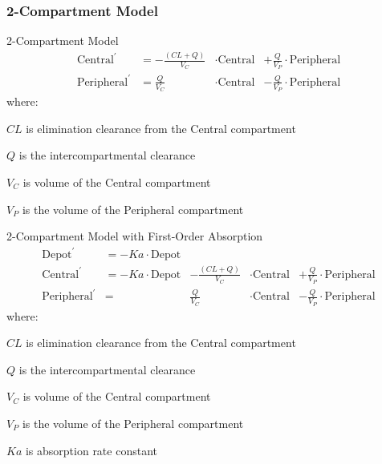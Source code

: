 \subsubsection{2-Compartment Model}
\begin{frame}{2-Compartment Model}
    $$
        \begin{aligned}
            \text{Central}^{\prime}    & = -\frac{(CL + Q)}{V_C} & \cdot \text{Central} & + \frac{Q}{V_P} \cdot \text{Peripheral} \\
            \text{Peripheral}^{\prime} & =        \frac{Q}{V_C}  & \cdot \text{Central} & - \frac{Q}{V_P} \cdot \text{Peripheral}
        \end{aligned}
    $$
    where:
    \begin{vfilleditems}
        \item $CL$ is elimination clearance from the Central compartment
        \item $Q$ is the intercompartmental clearance
        \item $V_C$ is volume of the Central compartment
        \item $V_P$ is the volume of the Peripheral compartment
    \end{vfilleditems}
\end{frame}

\begin{frame}{2-Compartment Model with First-Order Absorption}
    $$
        \begin{aligned}
            \text{Depot}^{\prime}      & =        -Ka \cdot \text{Depot}                                                                                          \\
            \text{Central}^{\prime}    & = -Ka \cdot \text{Depot}        & -\frac{(CL + Q)}{V_C} & \cdot \text{Central} & + \frac{Q}{V_P} \cdot \text{Peripheral} \\
            \text{Peripheral}^{\prime} & =                               & \frac{Q}{V_C}         & \cdot \text{Central} & - \frac{Q}{V_P} \cdot \text{Peripheral}
        \end{aligned}
    $$
    where:
    \begin{vfilleditems}
        \item $CL$ is elimination clearance from the Central compartment
        \item $Q$ is the intercompartmental clearance
        \item $V_C$ is volume of the Central compartment
        \item $V_P$ is the volume of the Peripheral compartment
        \item $Ka$ is absorption rate constant
    \end{vfilleditems}
\end{frame}

